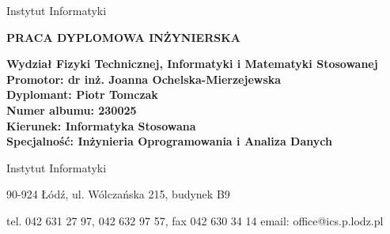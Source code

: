 {\begin{titlepage}
\begin{adjustwidth}{0cm}{0pt}
\begin{flushleft}
        {\selectfont\normalsize
        \textcolor{politechniczny}{Instytut Informatyki}}
    \end{flushleft}
    \end{adjustwidth}
    
    \begin{center}
        \vspace*{1.53cm}
        {\selectfont\large
        \uppercase{\textbf{Praca dyplomowa in\.zynierska}}
        
        \vspace*{5.1cm}
        
        \fontsize{18pt}{22pt}\selectfont
        \textbf{\thetitle}}
        
        \vfill
    \end{center}
    
    {\selectfont\normalsize
    \begin{adjustwidth}{1cm}{0pt}
    \begin{flushleft}
        \textbf{Wydział Fizyki Technicznej, Informatyki i Matematyki Stosowanej}\\
        \textbf{Promotor: dr inż. Joanna Ochelska-Mierzejewska} \\
        \textbf{Dyplomant: Piotr Tomczak} \\
        \textbf{Numer albumu: 230025} \\
        \textbf{Kierunek: Informatyka Stosowana} \\
        \textbf{Specjalność: Inżynieria Oprogramowania i Analiza Danych}
    \end{flushleft}
    \end{adjustwidth}
    
    \begin{center}
        \vspace*{2.05cm}
    \end{center}}
    
    \begin{adjustwidth}{0cm}{0pt}
    \begin{flushleft}
        {\selectfont\footnotesize
        \textcolor{politechniczny}{Instytut Informatyki}}
        
        \vspace*{0.1cm}
        
        {\selectfont\tiny
        90-924 \L{}\'od\'z, ul. W\'olcza\'nska 215, \textcolor{politechniczny}{budynek B9}
        
        \vspace*{-0.5cm}
        
        tel. 042 631 27 97, 042 632 97 57, fax 042 630 34 14 email: office@ics.p.lodz.pl}
        \vspace{-1.4cm}
    \end{flushleft}
    \end{adjustwidth}
\end{titlepage}}
\renewcommand{\baselinestretch}{1.5}
